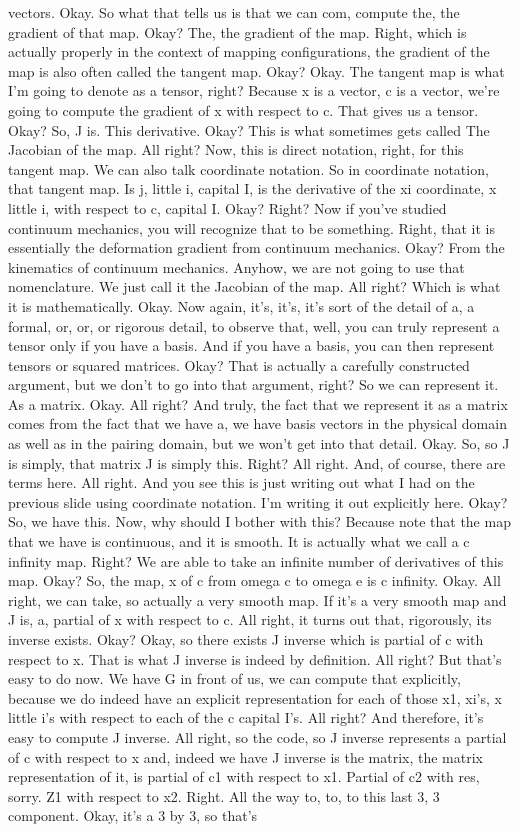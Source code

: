 \documentclass[10pt]{article}
\begin{document}
vectors. Okay. So what that tells us is that we can com, compute the, the gradient of that map. Okay? The, the gradient of the map. Right, which is actually properly in the context of mapping configurations, the gradient of the map is also often called the tangent map. Okay? Okay. The tangent map is what I'm going to denote as a tensor, right? Because x is a vector, c is a vector, we're going to compute the gradient of x with respect to c. That gives us a tensor. Okay? So, J is. This derivative. Okay? This is what sometimes gets called The Jacobian of the map. All right? Now, this is direct notation, right, for this tangent map. We can also talk coordinate notation. So in coordinate notation, that tangent map. Is j, little i, capital I, is the derivative of the xi coordinate, x little i, with respect to c, capital I. Okay? Right? Now if you've studied continuum mechanics, you will recognize that to be something. Right, that it is essentially the deformation gradient from continuum mechanics. Okay? From the kinematics of continuum mechanics. Anyhow, we are not going to use that nomenclature. We just call it the Jacobian of the map. All right? Which is what it is mathematically. Okay. Now again, it's, it's, it's sort of the detail of a, a formal, or, or, or rigorous detail, to observe that, well, you can truly represent a tensor only if you have a basis. And if you have a basis, you can then represent tensors or squared matrices. Okay? That is actually a carefully constructed argument, but we don't to go into that argument, right? So we can represent it. As a matrix. Okay. All right? And truly, the fact that we represent it as a matrix comes from the fact that we have a, we have basis vectors in the physical domain as well as in the pairing domain, but we won't get into that detail. Okay. So, so J is simply, that matrix J is simply this. Right? All right. And, of course, there are terms here. All right. And you see this is just writing out what I had on the previous slide using coordinate notation. I'm writing it out explicitly here. Okay? So, we have this. Now, why should I bother with this? Because note that the map that we have is continuous, and it is smooth. It is actually what we call a c infinity map. Right? We are able to take an infinite number of derivatives of this map. Okay? So, the map, x of c from omega c to omega e is c infinity. Okay. All right, we can take, so actually a very smooth map. If it's a very smooth map and J is, a, partial of x with respect to c. All right, it turns out that, rigorously, its inverse exists. Okay? Okay, so there exists J inverse which is partial of c with respect to x. That is what J inverse is indeed by definition. All right? But that's easy to do now. We have G in front of us, we can compute that explicitly, because we do indeed have an explicit representation for each of those x1, xi's, x little i's with respect to each of the c capital I's. All right? And therefore, it's easy to compute J inverse. All right, so the code, so J inverse represents a partial of c with respect to x and, indeed we have J inverse is the matrix, the matrix representation of it, is partial of c1 with respect to x1. Partial of c2 with res, sorry. Z1 with respect to x2. Right. All the way to, to, to this last 3, 3 component. Okay, it's a 3 by 3, so that's 
\end{document}
